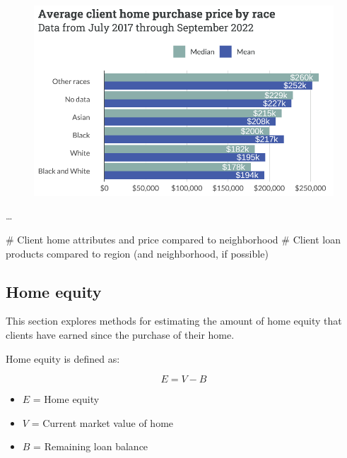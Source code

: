 \documentclass[
  letterpaper,
  DIV=11,
  numbers=noendperiod]{scrartcl}
\newenvironment{Shaded}{\begin{snugshade}}{\end{snugshade}}
\newcommand{\CommentTok}[1]{\textcolor[rgb]{0.37,0.37,0.37}{#1}}
\providecommand{\tightlist}{%
  \setlength{\itemsep}{0pt}\setlength{\parskip}{0pt}}\usepackage{longtable,booktabs,array}
\begin{document}
\begin{figure}[H]

{\centering \includegraphics{piedmont_files/figure-pdf/price-race-1.pdf}

}

\end{figure}

\ldots{}

\begin{Shaded}
\begin{Highlighting}[]
\CommentTok{\# Client home attributes and price compared to neighborhood}
\CommentTok{\# Client loan products compared to region (and neighborhood, if possible)}
\end{Highlighting}
\end{Shaded}

\hypertarget{sec-home-equity}{%
\subsection{Home equity}\label{sec-home-equity}}

This section explores methods for estimating the amount of home equity
that clients have earned since the purchase of their home.

Home equity is defined as:

\[E = V - B\]

\begin{itemize}
\tightlist
\item
  \(E\) = Home equity
\item
  \(V\) = Current market value of home
\item
  \(B\) = Remaining loan balance
\end{itemize}
\end{document}
